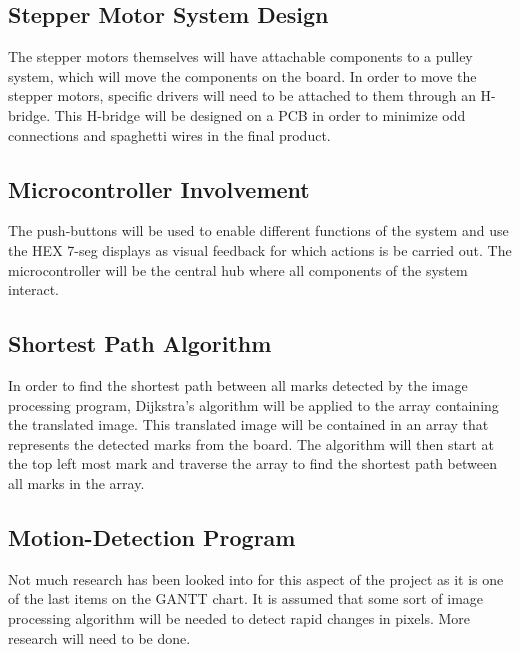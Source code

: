 \subsection{Stepper Motor System Design}
The stepper motors themselves will have attachable components to a pulley system, which will move the components on the board. In order to move the stepper motors, specific drivers will need to be attached to them through an H-bridge. This H-bridge will be designed on a PCB in order to minimize odd connections and spaghetti wires in the final product.
\subsection{Microcontroller Involvement}
The push-buttons will be used to enable different functions of the system and use the HEX 7-seg displays as visual feedback for which actions is be carried out. The microcontroller will be the central hub where all components of the system interact.  
\subsection{Shortest Path Algorithm}
In order to find the shortest path between all marks detected by the image processing program, Dijkstra's algorithm will be applied to the array containing the translated image. This translated image will be contained in an array that represents the detected marks from the board. The algorithm will then start at the top left most mark and traverse the array to find the shortest path between all marks in the array.
\subsection{Motion-Detection Program}
Not much research has been looked into for this aspect of the project as it is one of the last items on the GANTT chart. It is assumed that some sort of image processing algorithm will be needed to detect rapid changes in pixels. More research will need to be done. \\

